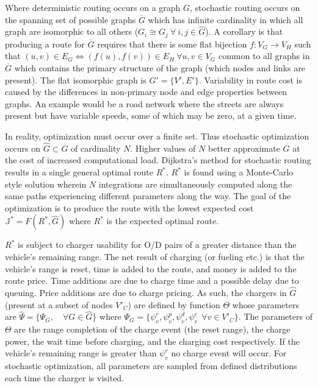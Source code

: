 Where deterministic routing occurs on a graph $G$, stochastic routing occurs on the spanning set of possible graphs $\overline{G}$ which has infinite cardinality in which all graph are isomorphic to all others ($G_i \cong G_j \ \forall \ i,j \in\hat{G}$). A corollary is that producing a route for $\overline{G}$ requires that there is some flat bijection $f:V_G\rightarrow V_H$ such that $(u,v)\in E_G \iff (f(u),f(v))\in E_H\ \forall u, v \in V_G$ common to all graphs in $\overline{G}$ which contains the primary structure of the graph (which nodes and links are present). The flat isomorphic graph is $G' = \{V', E'\}$. Variability in route cost is caused by the differences in non-primary node and edge properties between graphs. An example would be a road network where the streets are always present but have variable speeds, some of which may be zero, at a given time.

In reality, optimization must occur over a finite set. Thus stochastic optimization occurs on $\hat{G}\subset\overline{G}$ of cardinality $N$. Higher values of $N$ better approximate $\overline{G}$ at the cost of increased computational load. Dijkstra's method for stochastic routing results in a single general optimal route $R^*$. $R^*$ is found using a Monte-Carlo style solution wherein $N$ integrations are simultaneously computed along the same paths experiencing different parameters along the way. The goal of the optimization is to produce the route with the lowest expected cost $\mathbb{J}^* = F(R^*,\hat{G})$ where $R^*$ is the expected optimal route.

$R^*$ is subject to charger usability for O/D pairs of a greater distance than the vehicle's remaining range. The net result of charging (or fueling etc.) is that the vehicle's range is reset, time is added to the route, and money is added to the route price. Time additions are due to charge time and a possible delay due to queuing. Price additions are due to charge pricing. As such, the chargers in $\hat{G}$ (present at a subset of nodes $V'_C$) are defined by function $\Theta$ whose parameters are $\hat{\Psi} = \{\Psi_G,\quad \forall G\in \hat{G}\}$ where $\Psi_G = \{\psi_v^r,\psi_v^p,\psi_v^d,\psi_v^c\ \ \forall v\in V'_C\}$. The parameters of $\Theta$ are the range completion of the charge event (the reset range), the charge power, the wait time before charging, and the charging cost respectively. If the vehicle's remaining range is greater than $\psi_v^r$ no charge event will occur. For stochastic optimization, all parameters are sampled from defined distributions each time the charger is visited.

